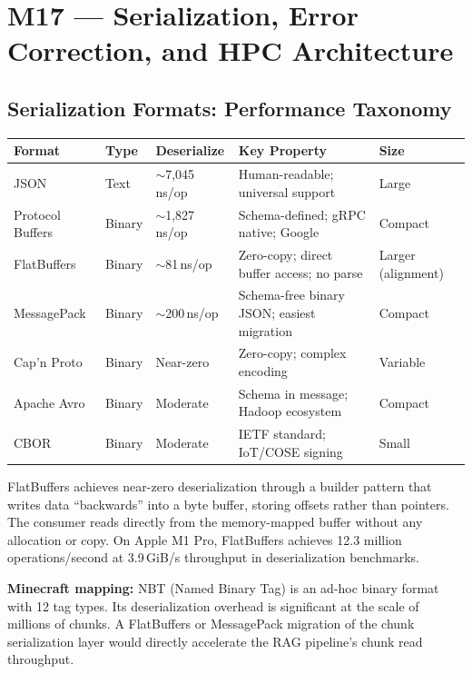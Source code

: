 \documentclass[11pt,letterpaper]{article}
\newcommand{\thead}[1]{\cellcolor{TableHead}\textbf{\sffamily\color{white}\small #1}}
\newcommand{\altrow}{\rowcolor{TableAlt}}
\begin{document}
\newpage

\section{M17 — Serialization, Error Correction, and HPC Architecture}

\subsection{Serialization Formats: Performance Taxonomy}

\begin{longtable}{p{2.8cm}p{2cm}p{2.5cm}p{3.5cm}p{2cm}}
\toprule
\thead{Format} & \thead{Type} & \thead{Deserialize} & \thead{Key Property} & \thead{Size} \\
\midrule
\endhead
JSON & Text & $\sim$7,045\,ns/op & Human-readable; universal support & Large \\
\altrow Protocol Buffers & Binary & $\sim$1,827\,ns/op & Schema-defined; gRPC native; Google & Compact \\
FlatBuffers & Binary & $\sim$81\,ns/op & Zero-copy; direct buffer access; no parse & Larger (alignment) \\
\altrow MessagePack & Binary & $\sim$200\,ns/op & Schema-free binary JSON; easiest migration & Compact \\
Cap'n Proto & Binary & Near-zero & Zero-copy; complex encoding & Variable \\
\altrow Apache Avro & Binary & Moderate & Schema in message; Hadoop ecosystem & Compact \\
CBOR & Binary & Moderate & IETF standard; IoT/COSE signing & Small \\
\bottomrule
\end{longtable}

FlatBuffers achieves near-zero deserialization through a builder pattern that writes data ``backwards'' into a byte buffer, storing offsets rather than pointers. The consumer reads directly from the memory-mapped buffer without any allocation or copy. On Apple M1 Pro, FlatBuffers achieves 12.3 million operations/second at 3.9\,GiB/s throughput in deserialization benchmarks.

\textbf{Minecraft mapping:} NBT (Named Binary Tag) is an ad-hoc binary format with 12 tag types. Its deserialization overhead is significant at the scale of millions of chunks. A FlatBuffers or MessagePack migration of the chunk serialization layer would directly accelerate the RAG pipeline's chunk read throughput.
\end{document}
